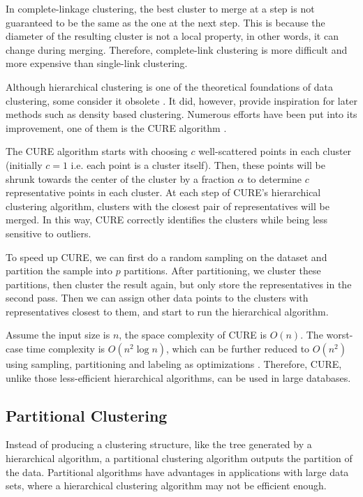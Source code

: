 \documentclass[conference]{IEEEtran}
\begin{document}
In complete-linkage clustering, the best cluster to merge at a step is not guaranteed to be the same as the one at the next step. This is because the diameter of the resulting cluster is not a local property, in other words, it can change during merging. Therefore, complete-link clustering is more difficult and more expensive than single-link clustering.

Although hierarchical clustering is one of the theoretical foundations of data clustering, some consider it obsolete \cite{jain2012survey}. It did, however, provide inspiration for later methods such as density based clustering. Numerous efforts have been put into its improvement, one of them is the CURE algorithm \cite{guha1998cure}.

The CURE algorithm starts with choosing $c$ well-scattered points in each cluster (initially $c = 1$ i.e. each point is a cluster itself). Then, these points will be shrunk towards the center of the cluster by a fraction $\alpha$ to determine $c$ representative points in each cluster. At each step of CURE's hierarchical clustering algorithm, clusters with the closest pair of representatives will be merged. In this way, CURE correctly identifies the clusters while being less sensitive to outliers.

To speed up CURE, we can first do a random sampling on the dataset and partition the sample into $p$ partitions. After partitioning, we cluster these partitions, then cluster the result again, but only store the representatives in the second pass. Then we can assign other data points to the clusters with representatives closest to them, and start to run the hierarchical algorithm.

Assume the input size is $n$, the space complexity of CURE is $O(n)$. The worst-case time complexity is $O(n^{2}\log n)$, which can be further reduced to $O(n^{2})$ using sampling, partitioning and labeling as optimizations \cite{gan2007data}. Therefore, CURE, unlike those less-efficient hierarchical algorithms, can be used in large databases.



\subsection{Partitional Clustering}
Instead of producing a clustering structure, like the tree generated by a hierarchical algorithm, a partitional clustering algorithm outputs the partition of the data. Partitional algorithms have advantages in applications with large data sets, where a hierarchical clustering algorithm may not be efficient enough.
\end{document}
